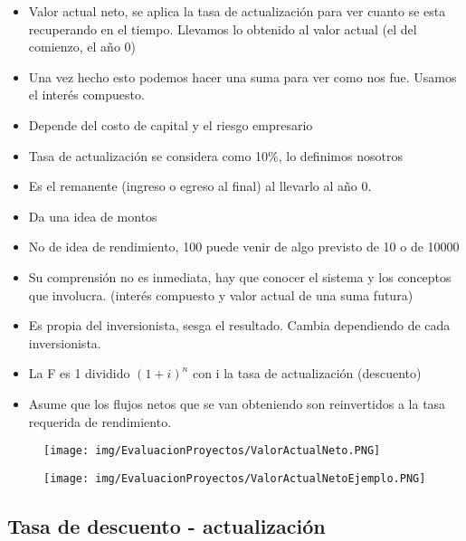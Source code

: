 \documentclass[titlepage,a4paper]{article}
\begin{document}
\begin{itemize}
\item Valor actual neto, se aplica la tasa de actualización para ver cuanto se esta recuperando en el tiempo. Llevamos lo obtenido al valor actual (el del comienzo, el año 0)
\item Una vez hecho esto podemos hacer una suma para ver como nos fue. Usamos el interés compuesto.
\item Depende del costo de capital y el riesgo empresario
\item Tasa de actualización se considera como 10\%, lo definimos nosotros
\item Es el remanente (ingreso o egreso al final) al llevarlo al año 0.
\item Da una idea de montos
\item No de idea de rendimiento, 100 puede venir de algo previsto de 10 o de 10000
\item Su comprensión no es inmediata, hay que conocer el sistema y los conceptos que involucra. (interés compuesto y valor actual de una suma futura)
\item Es propia del inversionista, sesga el resultado. Cambia dependiendo de cada inversionista.
\item La F es 1 dividido $(1+i)^n$ con i la tasa de actualización (descuento)
\item Asume que los flujos netos que se van obteniendo son reinvertidos a la tasa requerida de rendimiento.
\end{itemize}

\begin{figure}[!htb]
    \centering
    \texttt{[image: img/EvaluacionProyectos/ValorActualNeto.PNG]}
\end{figure}


\begin{figure}[!htb]
    \centering
    \texttt{[image: img/EvaluacionProyectos/ValorActualNetoEjemplo.PNG]}
\end{figure}

\newpage
\subsection{Tasa de descuento - actualización}
\end{document}
